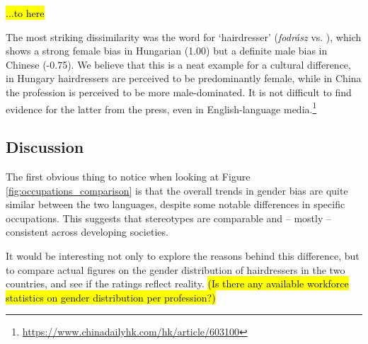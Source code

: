 \documentclass[11pt]{article}
\newcommand{\zh}[1]{\simplifiedchinesefont{#1}\rmfamily}
\begin{document}





\hl{...to here}

The most striking dissimilarity was the word for `hairdresser' (\textit{fodrász} vs. \zh{理发师}), which shows a strong female bias in Hungarian (1.00) but a definite male bias in Chinese (-0.75). We believe that this is a neat example for a cultural difference, in Hungary hairdressers are perceived to be predominantly female, while in China the profession is perceived to be more male-dominated. It is not difficult to find evidence for the latter from the press, even in English-language media.\footnote{\href{https://www.chinadailyhk.com/hk/article/603100}{https://www.chinadailyhk.com/hk/article/603100}}

\subsection{Discussion}\label{sec:discussion}

The first obvious thing to notice when looking at Figure \ref{fig:occupations_comparison} is that the overall trends in gender bias are quite similar between the two languages, despite some notable differences in specific occupations. This suggests that stereotypes are comparable and -- mostly -- consistent across developing societies.

It would be interesting not only to explore the reasons behind this difference, but to compare actual figures on the gender distribution of hairdressers in the two countries, and see if the ratings reflect reality. \hl{(Is there any available workforce statistics on gender distribution per profession?)}

\end{document}
